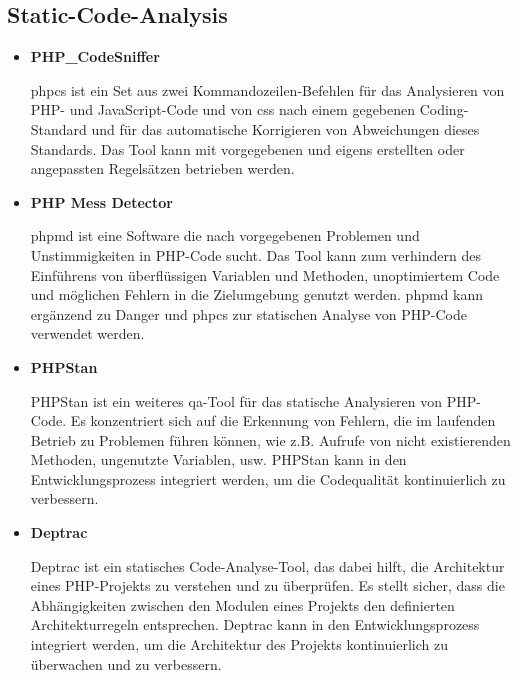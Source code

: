 \subsection*{Static-Code-Analysis}

\begin{itemize}
    \item {
        \textbf{PHP\_CodeSniffer}\par
        \acrfull{phpcs} ist ein Set aus zwei Kommandozeilen-Befehlen für das Analysieren von PHP-
        und JavaScript-Code und von \acrfull{css} nach einem gegebenen Coding-Standard und für
        das automatische Korrigieren von Abweichungen dieses Standards.
        Das Tool kann mit vorgegebenen und eigens erstellten oder angepassten Regelsätzen betrieben werden.
    }

    \item {
        \textbf{PHP Mess Detector}\par
        \acrfull{phpmd} ist eine Software die nach vorgegebenen Problemen und Unstimmigkeiten in
        PHP-Code sucht.
        Das Tool kann zum verhindern des Einführens von überflüssigen Variablen und Methoden, unoptimiertem Code und
        möglichen Fehlern in die Zielumgebung genutzt werden.
        \acrshort{phpmd} kann ergänzend zu Danger und \acrshort{phpcs} zur statischen Analyse von PHP-Code verwendet
        werden.
    }

    \item {
        \textbf{PHPStan}\par
        PHPStan ist ein weiteres \acrshort{qa}-Tool für das statische Analysieren von PHP-Code.
        Es konzentriert sich auf die Erkennung von Fehlern, die im laufenden Betrieb zu Problemen führen können, wie
        z.B. Aufrufe von nicht existierenden Methoden, ungenutzte Variablen, usw.
        PHPStan kann in den Entwicklungsprozess integriert werden, um die Codequalität kontinuierlich zu verbessern.
    }

    \item {
        \textbf{Deptrac}\par
        Deptrac ist ein statisches Code-Analyse-Tool, das dabei hilft, die Architektur eines PHP-Projekts zu verstehen
        und zu überprüfen.
        Es stellt sicher, dass die Abhängigkeiten zwischen den Modulen eines Projekts den definierten Architekturregeln
        entsprechen.
        Deptrac kann in den Entwicklungsprozess integriert werden, um die Architektur des Projekts kontinuierlich zu
        überwachen und zu verbessern.
    }


\end{itemize}
